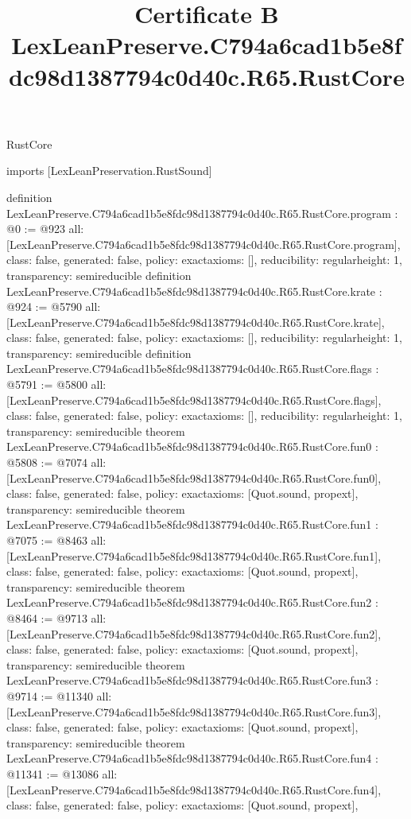 \begin{lexlean}{RustCore}
\title{Certificate B LexLeanPreserve.C794a6cad1b5e8fdc98d1387794c0d40c.R65.RustCore}
\begin{coremodule}
imports [LexLeanPreservation.RustSound]

definition LexLeanPreserve.C794a6cad1b5e8fdc98d1387794c0d40c.R65.RustCore.program : @0 := @923 {
  all: [LexLeanPreserve.C794a6cad1b5e8fdc98d1387794c0d40c.R65.RustCore.program],
  class: false,
  generated: false,
  policy: exact{axioms: []},
  reducibility: regular{height: 1},
  transparency: semireducible
}
definition LexLeanPreserve.C794a6cad1b5e8fdc98d1387794c0d40c.R65.RustCore.krate : @924 := @5790 {
  all: [LexLeanPreserve.C794a6cad1b5e8fdc98d1387794c0d40c.R65.RustCore.krate],
  class: false,
  generated: false,
  policy: exact{axioms: []},
  reducibility: regular{height: 1},
  transparency: semireducible
}
definition LexLeanPreserve.C794a6cad1b5e8fdc98d1387794c0d40c.R65.RustCore.flags : @5791 := @5800 {
  all: [LexLeanPreserve.C794a6cad1b5e8fdc98d1387794c0d40c.R65.RustCore.flags],
  class: false,
  generated: false,
  policy: exact{axioms: []},
  reducibility: regular{height: 1},
  transparency: semireducible
}
theorem LexLeanPreserve.C794a6cad1b5e8fdc98d1387794c0d40c.R65.RustCore.fun0 : @5808 := @7074 {
  all: [LexLeanPreserve.C794a6cad1b5e8fdc98d1387794c0d40c.R65.RustCore.fun0],
  class: false,
  generated: false,
  policy: exact{axioms: [Quot.sound, propext]},
  transparency: semireducible
}
theorem LexLeanPreserve.C794a6cad1b5e8fdc98d1387794c0d40c.R65.RustCore.fun1 : @7075 := @8463 {
  all: [LexLeanPreserve.C794a6cad1b5e8fdc98d1387794c0d40c.R65.RustCore.fun1],
  class: false,
  generated: false,
  policy: exact{axioms: [Quot.sound, propext]},
  transparency: semireducible
}
theorem LexLeanPreserve.C794a6cad1b5e8fdc98d1387794c0d40c.R65.RustCore.fun2 : @8464 := @9713 {
  all: [LexLeanPreserve.C794a6cad1b5e8fdc98d1387794c0d40c.R65.RustCore.fun2],
  class: false,
  generated: false,
  policy: exact{axioms: [Quot.sound, propext]},
  transparency: semireducible
}
theorem LexLeanPreserve.C794a6cad1b5e8fdc98d1387794c0d40c.R65.RustCore.fun3 : @9714 := @11340 {
  all: [LexLeanPreserve.C794a6cad1b5e8fdc98d1387794c0d40c.R65.RustCore.fun3],
  class: false,
  generated: false,
  policy: exact{axioms: [Quot.sound, propext]},
  transparency: semireducible
}
theorem LexLeanPreserve.C794a6cad1b5e8fdc98d1387794c0d40c.R65.RustCore.fun4 : @11341 := @13086 {
  all: [LexLeanPreserve.C794a6cad1b5e8fdc98d1387794c0d40c.R65.RustCore.fun4],
  class: false,
  generated: false,
  policy: exact{axioms: [Quot.sound, propext]},
}
\end{coremodule}
\end{lexlean}
